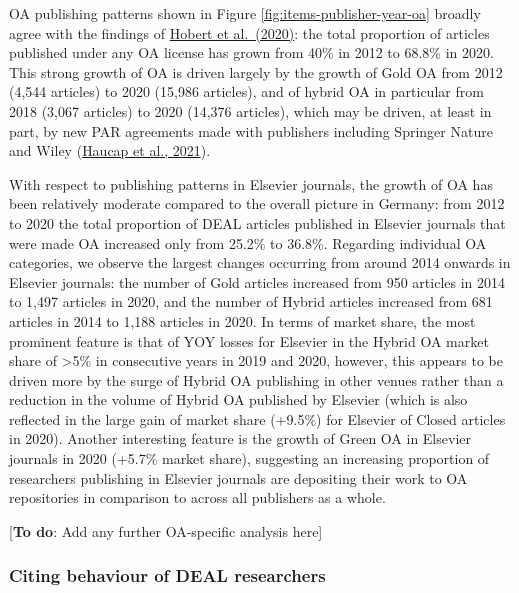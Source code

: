 \documentclass[
]{article}
\begin{document}
OA publishing patterns shown in Figure \ref{fig:items-publisher-year-oa} broadly agree with the findings of \href{http://doi.org/10.5281/zenodo.3892951}{Hobert et al.~(2020)}: the total proportion of articles published under any OA license has grown from 40\% in 2012 to 68.8\% in 2020. This strong growth of OA is driven largely by the growth of Gold OA from 2012 (4,544 articles) to 2020 (15,986 articles), and of hybrid OA in particular from 2018 (3,067 articles) to 2020 (14,376 articles), which may be driven, at least in part, by new PAR agreements made with publishers including Springer Nature and Wiley (\href{https://www.cesifo.org/en/publikationen/2021/working-paper/impact-german-deal-competition-academic-publishing-market}{Haucap et al., 2021}).

With respect to publishing patterns in Elsevier journals, the growth of OA has been relatively moderate compared to the overall picture in Germany: from 2012 to 2020 the total proportion of DEAL articles published in Elsevier journals that were made OA increased only from 25.2\% to 36.8\%. Regarding individual OA categories, we observe the largest changes occurring from around 2014 onwards in Elsevier journals: the number of Gold articles increased from 950 articles in 2014 to 1,497 articles in 2020, and the number of Hybrid articles increased from 681 articles in 2014 to 1,188 articles in 2020. In terms of market share, the most prominent feature is that of YOY losses for Elsevier in the Hybrid OA market share of \textgreater5\% in consecutive years in 2019 and 2020, however, this appears to be driven more by the surge of Hybrid OA publishing in other venues rather than a reduction in the volume of Hybrid OA published by Elsevier (which is also reflected in the large gain of market share (+9.5\%) for Elsevier of Closed articles in 2020). Another interesting feature is the growth of Green OA in Elsevier journals in 2020 (+5.7\% market share), suggesting an increasing proportion of researchers publishing in Elsevier journals are depositing their work to OA repositories in comparison to across all publishers as a whole.

{[}\textbf{To do}: Add any further OA-specific analysis here{]}

\hypertarget{citing-behaviour-of-deal-researchers}{%
\subsubsection{Citing behaviour of DEAL researchers}\label{citing-behaviour-of-deal-researchers}}
\end{document}
